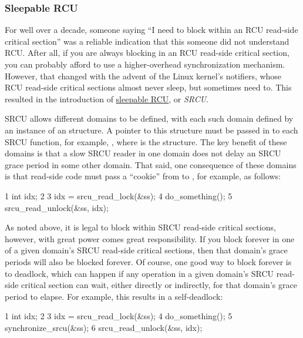 \subsubsection{Sleepable RCU}

For well over a decade, someone saying ``I need to block within an RCU
read-side critical section'' was a reliable indication that this someone
did not understand RCU\@.
After all, if you are always blocking in an RCU
read-side critical section, you can probably afford to use a
higher-overhead synchronization mechanism.
However, that changed with
the advent of the Linux kernel's notifiers, whose RCU read-side critical
sections almost never sleep, but sometimes need to.
This resulted in the
introduction of \href{https://lwn.net/Articles/202847/}{sleepable RCU}, or
\emph{SRCU}.

SRCU allows different domains to be defined, with each such domain
defined by an instance of an  structure.
A pointer to
this structure must be passed in to each SRCU function, for example,
, where  is the 
structure.
The key benefit of these domains is that a slow SRCU reader
in one domain does not delay an SRCU grace period in some other domain.
That said, one consequence of these domains is that read-side code must
pass a ``cookie'' from  to , for
example, as follows:

\begin{VerbatimN}
       1 int idx;
       2
       3 idx = srcu_read_lock(&ss);
       4 do_something();
       5 srcu_read_unlock(&ss, idx);
\end{VerbatimN}

As noted above, it is legal to block within SRCU read-side critical
sections, however, with great power comes great responsibility.
If you
block forever in one of a given domain's SRCU read-side critical
sections, then that domain's grace periods will also be blocked forever.
Of course, one good way to block forever is to deadlock, which can
happen if any operation in a given domain's SRCU read-side critical
section can wait, either directly or indirectly, for that domain's grace
period to elapse.
For example, this results in a self-deadlock:

\begin{VerbatimN}
       1 int idx;
       2
       3 idx = srcu_read_lock(&ss);
       4 do_something();
       5 synchronize_srcu(&ss);
       6 srcu_read_unlock(&ss, idx);
\end{VerbatimN}

